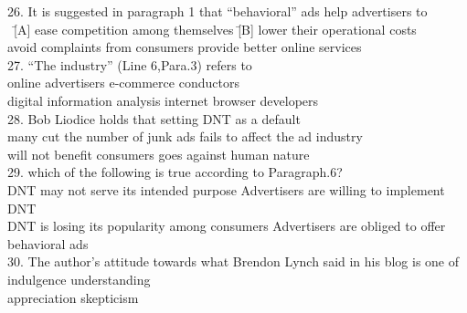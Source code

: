 \begin{tabbing}
26. It is suggested in paragraph 1 that ``behavioral'' ads help advertisers to\\
\hspace{0cm}\ \=[A] ease competition among themselves \quad\quad\quad\quad\quad\= [B] lower their operational costs\\
\> [C] avoid complaints from consumers
\> [D] provide better online services\\

27. ``The industry'' (Line 6,Para.3) refers to\\
\> [A] online advertisers
\> [B] e-commerce conductors\\
\> [C] digital information analysis
\> [D] internet browser developers\\

28. Bob Liodice holds that setting DNT as a default\\
\> [A] many cut the number of junk ads
\> [B] fails to affect the ad industry\\
\> [C] will not benefit consumers
\> [D] goes against human nature\\

29. which of the following is true according to Paragraph.6?\\
\> [A] DNT may not serve its intended purpose
\> [B] Advertisers are willing to implement DNT\\
\> [C] DNT is losing its popularity among consumers
\> [D] Advertisers are obliged to offer behavioral ads\\

30. The author's attitude towards what Brendon Lynch said in his blog is one of\\
\> [A] indulgence
\> [B] understanding\\
\> [C] appreciation
\> [D] skepticism
\end{tabbing}